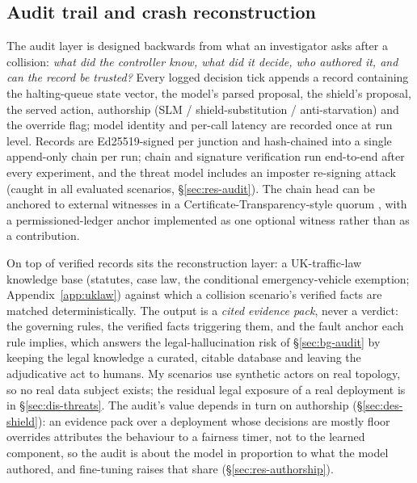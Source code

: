 \subsection{Audit trail and crash reconstruction}\label{sec:des-audit}
The audit layer is designed backwards from what an investigator asks after
a collision: \emph{what did the controller know, what did it decide, who
authored it, and can the record be trusted?} Every logged decision tick
appends a record containing the halting-queue state vector, the model's
parsed proposal, the shield's proposal, the served action, authorship (SLM
/ shield-substitution / anti-starvation) and the override flag; model
identity and per-call latency are recorded once at run level. Records are
Ed25519-signed per junction and hash-chained into a single append-only
chain per run; chain and signature verification run end-to-end after every
experiment, and the threat model includes an imposter re-signing attack
(caught in all evaluated scenarios, \S\ref{sec:res-audit}). The chain head
can be anchored to external witnesses in a Certificate-Transparency-style
quorum \cite{rfc6962}, with a permissioned-ledger anchor implemented as one
optional witness rather than as a contribution.

On top of verified records sits the reconstruction layer: a UK-traffic-law
knowledge base (statutes, case law, the conditional emergency-vehicle
exemption; Appendix~\ref{app:uklaw}) against which a collision scenario's
verified facts are matched deterministically. The output is a \emph{cited evidence pack}, never a
verdict: the governing rules, the verified facts triggering them, and the
fault anchor each rule implies, which answers the legal-hallucination risk
\cite{dahl2024legal} of \S\ref{sec:bg-audit} by keeping the legal
knowledge a curated, citable database and leaving the adjudicative act to
humans. My scenarios use synthetic actors on real topology, so no real
data subject exists; the residual legal exposure of a real deployment is
in \S\ref{sec:dis-threats}. The audit's value depends in turn on
authorship (\S\ref{sec:des-shield}): an evidence pack over a deployment
whose decisions are mostly floor overrides attributes the behaviour to a
fairness timer, not to the learned component, so the audit is about the
model in proportion to what the model authored, and fine-tuning raises
that share (\S\ref{sec:res-authorship}).

